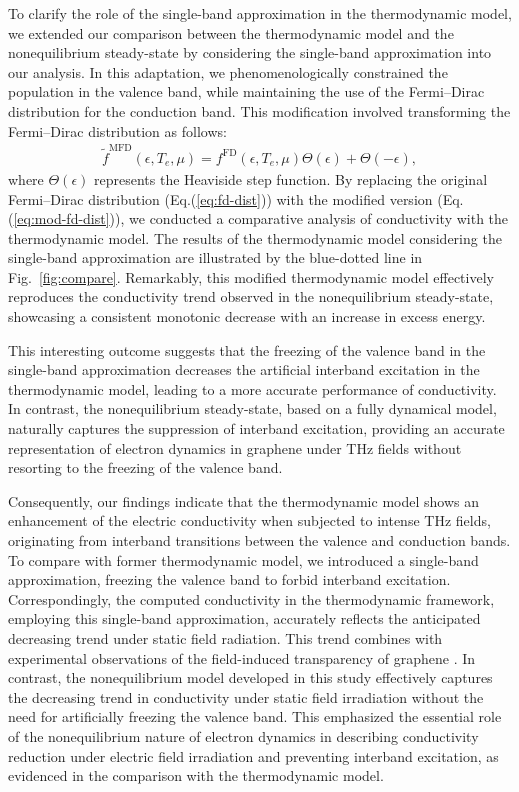 To clarify the role of the single-band approximation in the thermodynamic model, we extended our comparison between the thermodynamic model and the nonequilibrium steady-state by considering the single-band approximation into our analysis. In this adaptation, we phenomenologically constrained the population in the valence band, while maintaining the use of the Fermi--Dirac distribution for the conduction band. This modification involved transforming the Fermi--Dirac distribution as follows:
\begin{align}
	\tilde f^{\mathrm{MFD}}(\epsilon, T_e, \mu)=f^{\mathrm{FD}}(\epsilon, T_e, \mu)\Theta(\epsilon)+\Theta(-\epsilon),
	\label{eq:mod-fd-dist}
\end{align}
where $\Theta(\epsilon)$ represents the Heaviside step function. By replacing the original Fermi--Dirac distribution (Eq.(\ref{eq:fd-dist})) with the modified version (Eq.(\ref{eq:mod-fd-dist})), we conducted a comparative analysis of conductivity with the thermodynamic model. The results of the thermodynamic model considering the single-band approximation are illustrated by the blue-dotted line in Fig.~\ref{fig:compare}. Remarkably, this modified thermodynamic model effectively reproduces the conductivity trend observed in the nonequilibrium steady-state, showcasing a consistent monotonic decrease with an increase in excess energy.

This interesting outcome suggests that the freezing of the valence band in the single-band approximation decreases the artificial interband excitation in the thermodynamic model, leading to a more accurate performance of conductivity. In contrast, the nonequilibrium steady-state, based on a fully dynamical model, naturally captures the suppression of interband excitation, providing an accurate representation of electron dynamics in graphene under THz fields without resorting to the freezing of the valence band.

Consequently, our findings indicate that the thermodynamic model shows an enhancement of the electric conductivity when subjected to intense THz fields, originating from interband transitions between the valence and conduction bands. To compare with former thermodynamic model\cite{kovalev2021electrical}, we introduced a single-band approximation, freezing the valence band to forbid interband excitation. Correspondingly, the computed conductivity in the thermodynamic framework, employing this single-band approximation, accurately reflects the anticipated decreasing trend under static field radiation. This trend combines with experimental observations of the field-induced transparency of graphene \cite{Hwang2013, Paul_2013, doi:10.1063/1.4902999}. In contrast, the nonequilibrium model developed in this study effectively captures the decreasing trend in conductivity under static field irradiation without the need for artificially freezing the valence band. This emphasized the essential role of the nonequilibrium nature of electron dynamics in describing conductivity reduction under electric field irradiation and preventing interband excitation, as evidenced in the comparison with the thermodynamic model.
